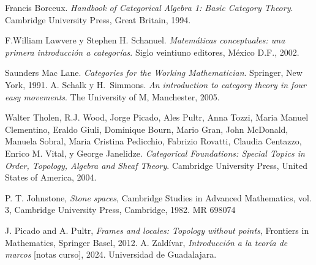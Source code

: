\documentclass{comunicaciones}
\begin{document}
\noindent 
\begin{thebibliography}{99}

 Francis Borceux. \textit{Handbook of Categorical Algebra 1: Basic Category Theory}. Cambridge University Press, Great Britain, 1994.

 F.William Lawvere y Stephen H. Schanuel. \textit{Matemáticas conceptuales: una primera introducción a categorías}. Siglo veintiuno editores, México D.F., 2002.

 Saunders Mac Lane. \textit{Categories for the Working Mathematician}. Springer, New York, 1991.
 A. Schalk y H.~Simmons. \textit{An introduction to category theory in four easy movements}. The University of M, Manchester, 2005.

 Walter Tholen, R.J. Wood, Jorge Picado, Ales Pultr, Anna Tozzi, Maria Manuel Clementino, Eraldo Giuli, Dominique Bourn, Mario Gran, 
John McDonald, Manuela Sobral, Maria Cristina Pedicchio, Fabrizio Rovatti, Claudia Centazzo, Enrico M. Vital, y George Janelidze.
\textit{Categorical Foundations: Special Topics in Order, Topology, Algebra and Sheaf Theory}. Cambridge University Press, United States of America, 2004.

 P. T. Johnstone, \textit{Stone spaces}, Cambridge Studies in Advanced Mathematics, vol. 3, Cambridge University Press, Cambridge, 1982. MR 698074
  
 J. Picado and A. Pultr, \textit{Frames and locales: Topology without points}, Frontiers in Mathematics, Springer Basel, 2012.
 A. Zaldívar, \textit{Introducción a la teoría de marcos} [notas curso], 2024. Universidad de Guadalajara.

\end{thebibliography}
\end{document}
